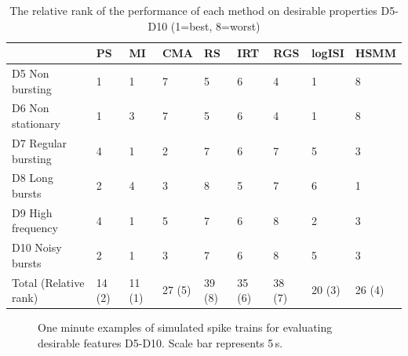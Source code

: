 \documentclass[12pt, titlepage]{article}
\begin{document}
			\begin{table}
		\centering \begin{tabular}{|l|llllllll|}
					\hline
					& PS & MI & CMA & RS & IRT & RGS & logISI & HSMM
					\\ \hline \rowcolor{Gray} D5 Non bursting & 1 & 1 & 7 & 5 & 6 & 4 & 1 &  8
					\\D6 Non stationary & 1 & 3 & 7 & 5 & 6 & 4 & 1 & 8 
					\\ \rowcolor{Gray}D7 Regular bursting & 4 & 1 & 2 & 7 & 6 & 7 & 5 & 3
					\\ D8 Long bursts & 2 & 4 & 3 & 8 & 5 & 7 & 6 & 1
					\\ \rowcolor{Gray} D9 High frequency & 4 & 1 & 5 & 7 & 6 & 8 & 2 & 3
					\\ D10 Noisy bursts & 2 & 1 & 3 & 7 & 6 & 8 & 5 & 3
					\\ \hline  \rowcolor{Gray} Total (Relative rank) & 14 (2) & 11 (1) & 27 (5) & 39 (8) & 35 (6) & 38 (7) & 20 (3) & 26 (4)
					\\ \hline
					\end{tabular}
					\caption{The relative rank of the performance of each method on desirable properties D5-D10 (1=best, 8=worst)} \label{des_results2}
					\end{table}		
		\begin{figure}[h]
			\centering
			\caption{One minute examples of simulated spike trains for evaluating desirable features D5-D10. Scale bar represents 5$\,$s.}
			\label{sim_egs}
		\end{figure}
\end{document}
